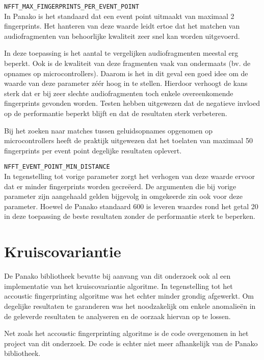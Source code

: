 \begin{description}
	\item\texttt{NFFT\_MAX\_FINGERPRINTS\_PER\_EVENT\_POINT} \hfill \\
	In Panako is het standaard dat een event point uitmaakt van maximaal 2 fingerprints. Het hanteren van deze waarde leidt ertoe dat het matchen van audiofragmenten van behoorlijke kwaliteit zeer snel kan worden uitgevoerd. 
	
	In deze toepassing is het aantal te vergelijken audiofragmenten meestal erg beperkt. Ook is de kwaliteit van deze fragmenten vaak van ondermaats (bv. de opnames op microcontrollers). Daarom is het in dit geval een goed idee om de waarde van deze parameter zéér hoog in te stellen. Hierdoor verhoogt de kans sterk dat er bij zeer slechte audiofragmenten toch enkele overeenkomende fingerprints gevonden worden. Testen hebben uitgewezen dat de negatieve invloed op de performantie beperkt blijft en dat de resultaten sterk verbeteren. 
	
	Bij het zoeken naar matches tussen geluidsopnames opgenomen op microcontrollers heeft de praktijk uitgewezen dat het toelaten van maximaal 50 fingerprints per event point degelijke resultaten oplevert.
	
	\item\texttt{NFFT\_EVENT\_POINT\_MIN\_DISTANCE} \hfill \\
	In tegenstelling tot vorige parameter zorgt het verhogen van deze waarde ervoor dat er minder fingerprints worden gecreëerd. De argumenten die bij vorige parameter zijn aangehaald gelden bijgevolg in omgekeerde zin ook voor deze parameter. Hoewel de Panako standaard 600 is leveren waardes rond het getal 20 in deze toepassing de beste resultaten zonder de performantie sterk te beperken.
	
	
\end{description}


\section{Kruiscovariantie}

De Panako bibliotheek bevatte bij aanvang van dit onderzoek ook al een implementatie van het kruiscovariantie algoritme. In tegenstelling tot het accoustic fingerprinting algoritme was het echter minder grondig afgewerkt. Om degelijke resultaten te garanderen was het noodzakelijk om enkele anomalieën in de geleverde resultaten te analyseren en de oorzaak hiervan op te lossen.

Net zoals het accoustic fingerprinting algoritme is de code overgenomen in het project van dit onderzoek. De code is echter niet meer afhankelijk van de Panako bibliotheek.

